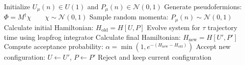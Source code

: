 \documentclass[11pt,titlepage]{article}
\begin{document}
\begin{algorithm}[H]
    \caption{Hamiltonian Monte Carlo Algorithm}\label{algorithm:HMC}
    \begin{algorithmic}[1]
        \State Initialize $U_\mu(n) \in U(1)$ and $P_\mu(n)\in \mathcal{N}(0, 1) $
            \State Generate pseudofermions: $\Phi = M^\dagger \chi\qquad \chi \sim \mathcal{N}(0, 1)$
            \State Sample random momenta: $P_\mu(n) \sim \mathcal{N}(0, 1)$ 
            \State Calculate initial Hamiltonian: $H_{\text{old}} = H[U, P]$
            \State Evolve system for $\tau$ trajectory time using leapfrog integrator 
            \State Calculate final Hamiltonian: $H_{\text{new}} = H[U', P']$
            \State Compute acceptance probability: $\alpha = \min(1, e^{-(H_{\text{new}} - H_{\text{old}})})$
                \State Accept new configuration: $U \leftarrow U'$, $P \leftarrow P'$
            \Else
                \State Reject and keep current configuration
            \EndIf
        \EndFor
    \end{algorithmic}
\end{algorithm}










\newpage
\printbibliography


\end{document}
